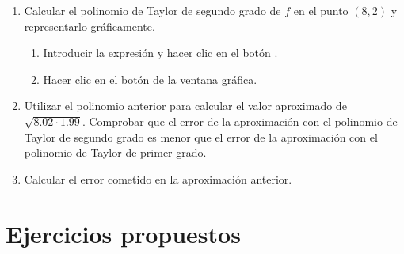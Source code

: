 \begin{enumerate}[leftmargin=*]
\begin{enumerate}
\item Calcular el polinomio de Taylor de segundo grado de $f$ en el punto $(8,2)$ y representarlo gráficamente.
\begin{indication}
\begin{enumerate}
\item Introducir la expresión  y hacer clic en el botón .
\item Hacer clic en el botón  de la ventana gráfica.
\end{enumerate}
\end{indication}

\item Utilizar el polinomio anterior para calcular el valor aproximado de $\sqrt{8.02\cdot 1.99}$.
Comprobar que el error de la aproximación con el polinomio de Taylor de segundo grado es menor que el error de la aproximación con el polinomio de Taylor de primer grado. 

\item Calcular el error cometido en la aproximación anterior.
\end{enumerate}
\end{enumerate}


\section{Ejercicios propuestos}

